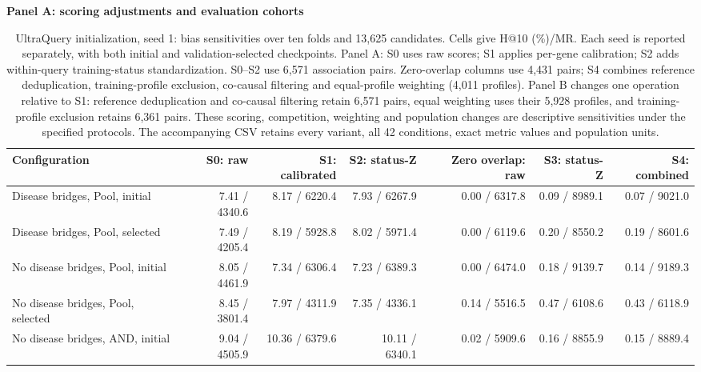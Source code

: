 \begin{landscape}
\begin{table}[p]
\centering\footnotesize
\setlength{\tabcolsep}{3pt}
\caption{UltraQuery initialization, seed 1: bias sensitivities over ten folds and 13,625 candidates. Cells give H@10 (\%)/MR. Each seed is reported separately, with both initial and validation-selected checkpoints. Panel A: S0 uses raw scores; S1 applies per-gene calibration; S2 adds within-query training-status standardization. S0--S2 use 6,571 association pairs. Zero-overlap columns use 4,431 pairs; S4 combines reference deduplication, training-profile exclusion, co-causal filtering and equal-profile weighting (4,011 profiles). Panel B changes one operation relative to S1: reference deduplication and co-causal filtering retain 6,571 pairs, equal weighting uses their 5,928 profiles, and training-profile exclusion retains 6,361 pairs. These scoring, competition, weighting and population changes are descriptive sensitivities under the specified protocols. The accompanying CSV retains every variant, all 42 conditions, exact metric values and population units.}
\label{tab:controlled_bias_ultraquery-seed1}
\textbf{Panel A: scoring adjustments and evaluation cohorts}\par\smallskip
\begin{adjustbox}{max width=\linewidth}
\begin{tabular}{lrrrrrr}
\toprule
Configuration & S0: raw & S1: calibrated & S2: status-Z & Zero overlap: raw & S3: status-Z & S4: combined \\
\midrule
Disease bridges, Pool, initial & 7.41 / 4340.6 & 8.17 / 6220.4 & 7.93 / 6267.9 & 0.00 / 6317.8 & 0.09 / 8989.1 & 0.07 / 9021.0 \\
Disease bridges, Pool, selected & 7.49 / 4205.4 & 8.19 / 5928.8 & 8.02 / 5971.4 & 0.00 / 6119.6 & 0.20 / 8550.2 & 0.19 / 8601.6 \\
No disease bridges, Pool, initial & 8.05 / 4461.9 & 7.34 / 6306.4 & 7.23 / 6389.3 & 0.00 / 6474.0 & 0.18 / 9139.7 & 0.14 / 9189.3 \\
No disease bridges, Pool, selected & 8.45 / 3801.4 & 7.97 / 4311.9 & 7.35 / 4336.1 & 0.14 / 5516.5 & 0.47 / 6108.6 & 0.43 / 6118.9 \\
No disease bridges, AND, initial & 9.04 / 4505.9 & 10.36 / 6379.6 & 10.11 / 6340.1 & 0.02 / 5909.6 & 0.16 / 8855.9 & 0.15 / 8889.4 \\

\end{tabular}
\end{adjustbox}
\end{table}
\end{landscape}
